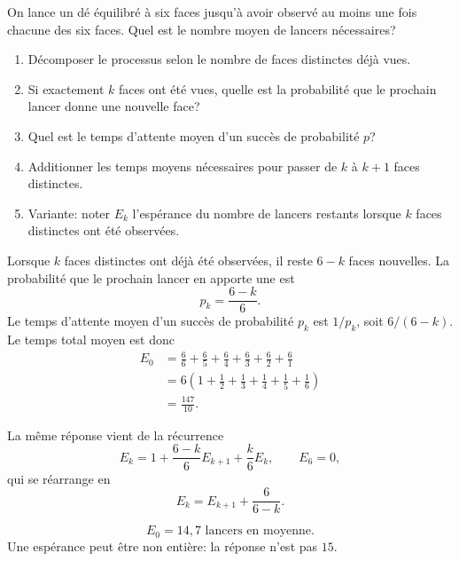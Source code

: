 \documentclass[11pt,a4paper]{article}
\begin{document}

\begin{statementbox}
On lance un dé équilibré à six faces jusqu'à avoir observé au moins une fois
chacune des six faces. Quel est le nombre moyen de lancers nécessaires?
\end{statementbox}

\begin{hintsbox}
\begin{enumerate}
  \item Décomposer le processus selon le nombre de faces distinctes déjà vues.
  \item Si exactement $k$ faces ont été vues, quelle est la probabilité que
  le prochain lancer donne une nouvelle face?
  \item Quel est le temps d'attente moyen d'un succès de probabilité $p$?
  \item Additionner les temps moyens nécessaires pour passer de $k$ à $k+1$
  faces distinctes.
  \item Variante: noter $E_k$ l'espérance du nombre de lancers restants
  lorsque $k$ faces distinctes ont été observées.
\end{enumerate}
\end{hintsbox}

\correction

Lorsque $k$ faces distinctes ont déjà été observées, il reste $6-k$ faces
nouvelles. La probabilité que le prochain lancer en apporte une est
\[
p_k=\frac{6-k}{6}.
\]
Le temps d'attente moyen d'un succès de probabilité $p_k$ est $1/p_k$, soit
$6/(6-k)$. Le temps total moyen est donc
\[
\begin{aligned}
E_0
&=\frac66+\frac65+\frac64+\frac63+\frac62+\frac61\\
&=6\left(1+\frac12+\frac13+\frac14+\frac15+\frac16\right)\\
&=\frac{147}{10}.
\end{aligned}
\]

La même réponse vient de la récurrence
\[
E_k=1+\frac{6-k}{6}E_{k+1}+\frac{k}{6}E_k,
\qquad E_6=0,
\]
qui se réarrange en
\[
E_k=E_{k+1}+\frac6{6-k}.
\]

\begin{resultbox}
\[
\boxed{E_0=14{,}7\text{ lancers en moyenne}.}
\]
Une espérance peut être non entière: la réponse n'est pas $15$.
\end{resultbox}
\end{document}

